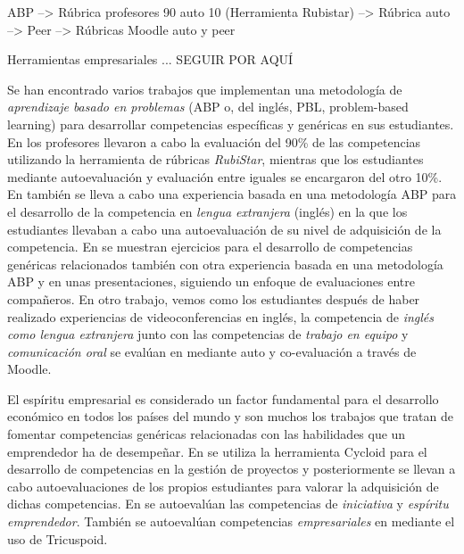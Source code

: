 ABP	--> Rúbrica profesores 90 auto 10 (Herramienta Rubistar) 	\cite{lasa2013problem}
		--> Rúbrica auto												\cite{renau2010teaching}
		--> Peer														\cite{johnson2002encouraging}
		--> Rúbricas Moodle auto y peer	 							\cite{masip2013self}

Herramientas empresariales ... SEGUIR POR AQUÍ

Se han encontrado varios trabajos que implementan una metodología de \emph{aprendizaje basado en problemas} (ABP o, del inglés, PBL, problem-based learning) para desarrollar competencias específicas y genéricas en sus estudiantes. En \cite{lasa2013problem} los profesores llevaron a cabo la evaluación del 90\% de las competencias utilizando la herramienta de rúbricas \emph{RubiStar}, mientras que los estudiantes mediante autoevaluación y evaluación entre iguales se encargaron del otro 10\%. En \cite{renau2010teaching} también se lleva a cabo una experiencia basada en una metodología ABP para el desarrollo de la competencia en \emph{lengua extranjera} (inglés) en la que los estudiantes llevaban a cabo una autoevaluación de su nivel de adquisición de la competencia. En \cite{johnson2002encouraging} se muestran ejercicios para el desarrollo de competencias genéricas relacionados también con otra experiencia basada en una metodología ABP y en unas presentaciones, siguiendo un enfoque de evaluaciones entre compañeros. En otro trabajo, vemos como los estudiantes después de haber realizado experiencias de videoconferencias en inglés, la competencia de \emph{inglés como lengua extranjera} junto con las competencias de \emph{trabajo en equipo} y \emph{comunicación oral} se evalúan en \cite{masip2013self} mediante auto y co-evaluación a través de Moodle.

El espíritu empresarial es considerado un factor fundamental para el desarrollo económico en todos los países del mundo \cite{DeXena2012educacion} y son muchos los trabajos que tratan de fomentar competencias genéricas relacionadas con las habilidades que un emprendedor ha de desempeñar. En \cite{chang2009international} se utiliza la herramienta Cycloid para el desarrollo de competencias en la gestión de proyectos y posteriormente se llevan a cabo autoevaluaciones de los propios estudiantes para valorar la adquisición de dichas competencias. En \cite{marquez2010have} se autoevalúan las competencias de \emph{iniciativa} y \emph{espíritu emprendedor}. También se autoevalúan competencias \emph{empresariales} en  \cite{achcaoucaou2014competence} mediante el uso de Tricuspoid. 


